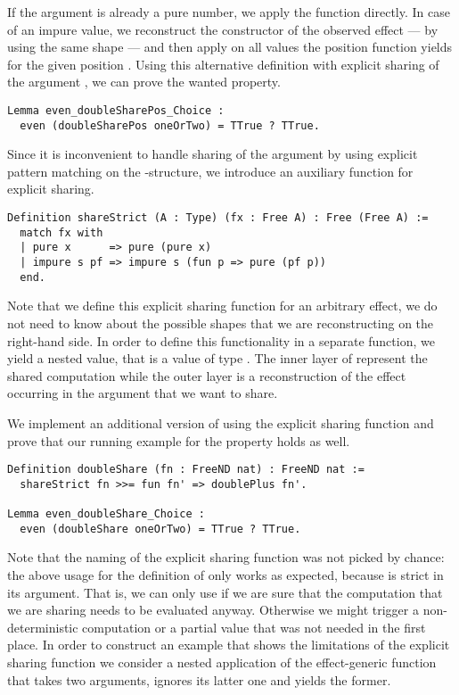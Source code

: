 If the argument  is already a pure number, we apply the function  directly.
In case of an impure value, we reconstruct the constructor of the observed effect --- by using the same shape  --- and then apply  on all values the position function  yields for the given position .
Using this alternative definition with explicit sharing of the argument , we can prove the wanted property.

\begin{verbatim}
Lemma even_doubleSharePos_Choice :
  even (doubleSharePos oneOrTwo) = TTrue ? TTrue.
\end{verbatim}

Since it is inconvenient to handle sharing of the argument  by using explicit pattern matching on the \--structure, we introduce an auxiliary function for explicit sharing.

\begin{verbatim}
Definition shareStrict (A : Type) (fx : Free A) : Free (Free A) :=
  match fx with
  | pure x      => pure (pure x)
  | impure s pf => impure s (fun p => pure (pf p))
  end.
\end{verbatim}

Note that we define this explicit sharing function for an arbitrary effect, we do not need to know about the possible shapes that we are reconstructing on the right\--hand side.
In order to define this functionality in a separate function, we yield a nested value, that is a value of type .
The inner layer of  represent the shared computation while the outer layer is a reconstruction of the effect occurring in the argument  that we want to share.

We implement an additional version of  using the explicit sharing function and prove that our running example for the property holds as well.

\begin{verbatim}
Definition doubleShare (fn : FreeND nat) : FreeND nat :=
  shareStrict fn >>= fun fn' => doublePlus fn'.

Lemma even_doubleShare_Choice :
  even (doubleShare oneOrTwo) = TTrue ? TTrue.
\end{verbatim}

Note that the naming of the explicit sharing function was not picked by chance: the above usage for the definition of  only works as expected, because  is strict in its argument.
That is, we can only use  if we are sure that the computation that we are sharing needs to be evaluated anyway.
Otherwise we might trigger a non\--deterministic computation or a partial value that was not needed in the first place.
In order to construct an example that shows the limitations of the explicit sharing function we consider a nested application of the effect\--generic function  that takes two arguments, ignores its latter one and yields the former.

